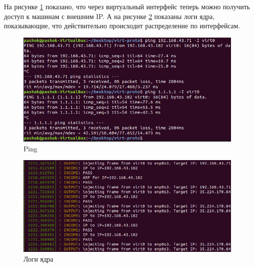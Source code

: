 \documentclass[14pt, a4paper]{extarticle}
\begin{document}
На рисунке \ref{ping} показано, что через виртуальный интерфейс теперь можно получить доступ к машинам с внешним IP. А на рисунке \ref{dmesg} показаны логи ядра, показывающие, что действительно происходит распределение по интерфейсам.
\begin{figure}[H]
	\centering
	\includegraphics[scale=0.8]{ping.png}
	\caption{Ping}
	\label{ping}
\end{figure}

\begin{figure}[H]
	\centering
	\includegraphics[scale=0.7]{dmesg.png}
	\caption{Логи ядра}
	\label{dmesg}
\end{figure}

\clearpage
\end{document}
